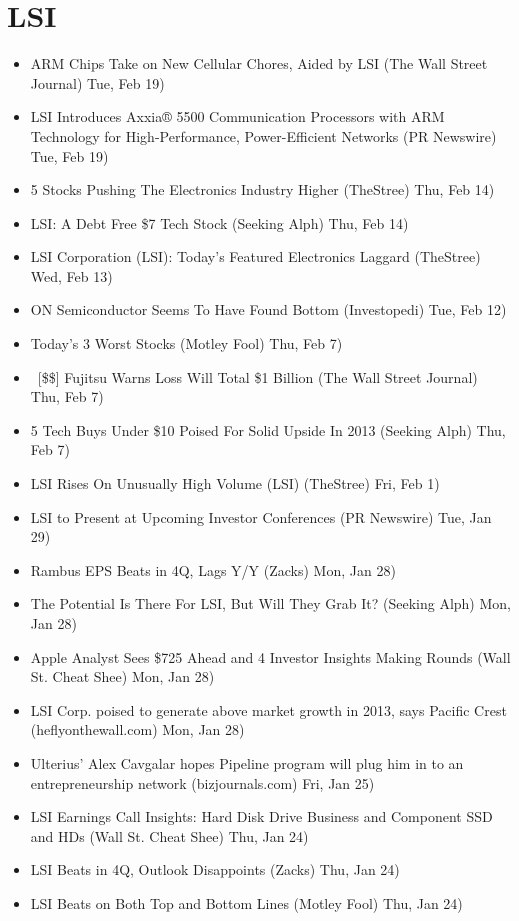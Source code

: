 \documentclass[11pt,asymmetric]{article}
\begin{document}
\section*{LSI}
\begin{itemize}
\item ARM Chips Take on New Cellular Chores, Aided by LSI (The Wall Street Journal) Tue, Feb 19)
\item LSI Introduces Axxia® 5500 Communication Processors with ARM Technology for High-Performance, Power-Efficient Networks (PR Newswire) Tue, Feb 19)
\item 5 Stocks Pushing The Electronics Industry Higher (TheStree) Thu, Feb 14)
\item LSI: A Debt Free \$7 Tech Stock (Seeking Alph) Thu, Feb 14)
\item LSI Corporation (LSI): Today's Featured Electronics Laggard (TheStree) Wed, Feb 13)
\item ON Semiconductor Seems To Have Found Bottom (Investopedi) Tue, Feb 12)
\item Today's 3 Worst Stocks (Motley Fool) Thu, Feb 7)
\item\ [\$\$] Fujitsu Warns Loss Will Total \$1 Billion (The Wall Street Journal) Thu, Feb 7)
\item 5 Tech Buys Under \$10 Poised For Solid Upside In 2013 (Seeking Alph) Thu, Feb 7)
\item LSI Rises On Unusually High Volume (LSI) (TheStree) Fri, Feb 1)
\item LSI to Present at Upcoming Investor Conferences (PR Newswire) Tue, Jan 29)
\item Rambus EPS Beats in 4Q, Lags Y/Y (Zacks) Mon, Jan 28)
\item The Potential Is There For LSI, But Will They Grab It? (Seeking Alph) Mon, Jan 28)
\item Apple Analyst Sees \$725 Ahead and 4 Investor Insights Making Rounds (Wall St. Cheat Shee) Mon, Jan 28)
\item LSI Corp. poised to generate above market growth in 2013, says Pacific Crest (heflyonthewall.com) Mon, Jan 28)
\item Ulterius’ Alex Cavgalar hopes Pipeline program will plug him in to an entrepreneurship network (bizjournals.com) Fri, Jan 25)
\item LSI Earnings Call Insights: Hard Disk Drive Business and Component SSD and HDs (Wall St. Cheat Shee) Thu, Jan 24)
\item LSI Beats in 4Q, Outlook Disappoints (Zacks) Thu, Jan 24)
\item LSI Beats on Both Top and Bottom Lines (Motley Fool) Thu, Jan 24)

\end{itemize}
\end{document}
